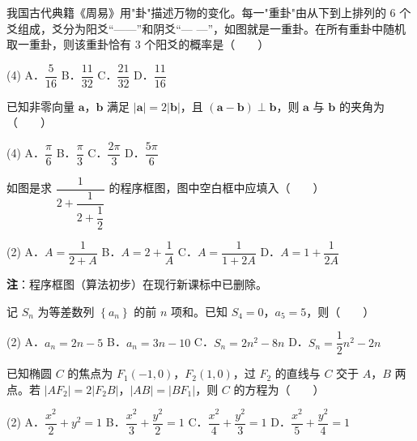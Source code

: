 \begin{question}
我国古代典籍《周易》用"卦"描述万物的变化。每一"重卦"由从下到上排列的 $6$ 个爻组成，爻分为阳爻“——”和阴爻“— —”，如图就是一重卦。在所有重卦中随机取一重卦，则该重卦恰有 $3$ 个阳爻的概率是\mbox{（　　）}

\begin{gkopts}(4)
\task A．$\dfrac5{16}$
\task B．$\dfrac{11}{32}$
\task C．$\dfrac{21}{32}$
\task D．$\dfrac{11}{16}$
\end{gkopts}

\end{question}
\begin{question}
已知非零向量 $\boldsymbol a$，$\boldsymbol b$ 满足 $|\boldsymbol a|=2|\boldsymbol b|$，且 $(\boldsymbol a-\boldsymbol b)\perp\boldsymbol b$，则 $\boldsymbol a$ 与 $\boldsymbol b$ 的夹角为\mbox{（　　）}

\begin{gkopts}(4)
\task A．$\dfrac\pi6$
\task B．$\dfrac\pi3$
\task C．$\dfrac{2\pi}3$
\task D．$\dfrac{5\pi}6$
\end{gkopts}

\Needspace{0.4\textheight}
\end{question}
\begin{question}
如图是求 $\dfrac1{2+\dfrac1{2+\dfrac12}}$ 的程序框图，图中空白框中应填入\mbox{（　　）}
\nopagebreak[4]
\begin{center}\end{center}
\nopagebreak[4]
\begin{gkopts}(2)
\task A．$A=\dfrac1{2+A}$
\task B．$A=2+\dfrac1A$
\task C．$A=\dfrac1{1+2A}$
\task D．$A=1+\dfrac1{2A}$
\end{gkopts}

\begin{gktip}
\textbf{注}：程序框图（算法初步）在现行新课标中已删除。
\end{gktip}

\end{question}
\begin{question}
记 $S_n$ 为等差数列 $\left\{a_n\right\}$ 的前 $n$ 项和。已知 $S_4=0$，$a_5=5$，则\mbox{（　　）}

\begin{gkopts}(2)
\task A．$a_n=2n-5$
\task B．$a_n=3n-10$
\task C．$S_n=2n^{2}-8n$
\task D．$S_n=\dfrac12n^{2}-2n$
\end{gkopts}

\end{question}
\begin{question}
已知椭圆 $C$ 的焦点为 $F_1(-1,0)$，$F_2(1,0)$，过 $F_2$ 的直线与 $C$ 交于 $A$，$B$ 两点。若 $\left|AF_2\right|=2\left|F_2B\right|$，$|AB|=\left|BF_1\right|$，则 $C$ 的方程为\mbox{（　　）}

\begin{gkopts}(2)
\task A．$\dfrac{x^{2}}2+y^{2}=1$
\task B．$\dfrac{x^{2}}3+\dfrac{y^{2}}2=1$
\task C．$\dfrac{x^{2}}4+\dfrac{y^{2}}3=1$
\task D．$\dfrac{x^{2}}5+\dfrac{y^{2}}4=1$
\end{gkopts}

\end{question}
